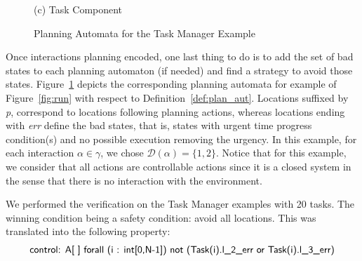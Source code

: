 \begin{figure}[ht]
\begin{minipage}[b]{\linewidth}
    (c) Task Component 
  \vspace{4ex}
  \end{minipage}%
  \caption{Planning Automata for the Task Manager Example}
  \label{fig:uppaal} 
\end{figure}

Once interactions planning encoded, one last thing to do is to add the set of bad states to each
planning automaton (if needed) and find a strategy to avoid those states. 
Figure~\ref{fig:uppaal} depicts the corresponding planning automata for example of 
Figure~\ref{fig:run} with respect to Definition~\ref{def:plan_aut}. 
Locations suffixed by \emph{p}, correspond to locations following 
planning actions, whereas locations ending with \emph{err} define the bad states, that is,
states with urgent time progress condition(s) and no possible execution removing the urgency. 
In this example, for each interaction $\alpha\in\gamma$, we chose $\mathcal{D}(\alpha)=\{1,2\}$.
Notice that for this example, we consider that all actions are controllable actions since
it is a closed system in the sense that there is no interaction with the environment.

We performed the verification on the Task Manager examples with 20 tasks. The winning 
condition being a safety condition: avoid all \emph{} locations. This was translated 
into the following property:
\begin{equation}\label{eq:avoid}
  \text{\textsf{control: A[ ] forall (i : int[0,N-1]) not (Task(i).l\_{2\_{err}} or 
  Task(i).l\_{3\_{err}})}}
\end{equation}

